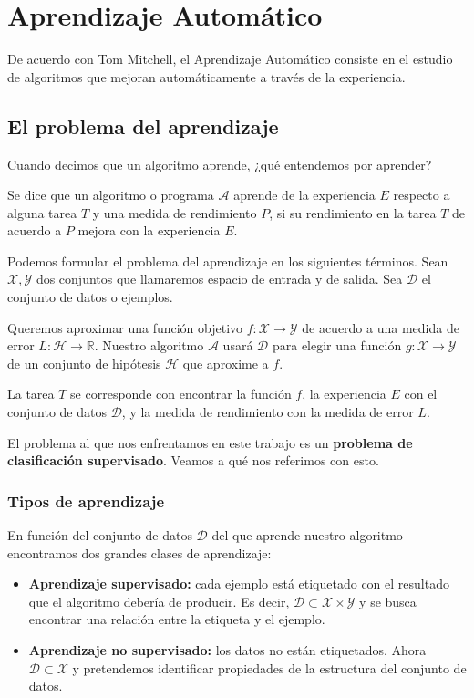 \chapter{\label{ch3}Aprendizaje Automático}

De acuerdo con Tom Mitchell, el Aprendizaje Automático consiste en el estudio de algoritmos que mejoran automáticamente a través de la experiencia. 

\section{El problema del aprendizaje}

Cuando decimos que un algoritmo aprende, ¿qué entendemos por aprender? 

\begin{definition*}
	Se dice que un algoritmo o programa $\mathcal{A}$ aprende de la experiencia $E$ respecto a alguna tarea $T$ y una medida de rendimiento $P$, si su rendimiento en la tarea $T$ de acuerdo a $P$ mejora con la experiencia $E$.
\end{definition*}

Podemos formular el problema del aprendizaje en los siguientes términos. Sean $\mathcal{X, Y}$ dos conjuntos que llamaremos espacio de entrada y de salida. Sea $\mathcal{D}$ el conjunto de datos o ejemplos.

Queremos aproximar una función objetivo $f: \mathcal{X} \to \mathcal{Y}$ de acuerdo a una medida de error $L: \mathcal{H} \to \mathbb{R}$. Nuestro algoritmo $\mathcal{A}$ usará $\mathcal{D}$ para elegir una función $g: \mathcal{X} \to \mathcal{Y}$ de un conjunto de hipótesis $\mathcal{H}$ que aproxime a $f$.

La tarea $T$ se corresponde con encontrar la función $f$, la experiencia $E$ con el conjunto de datos $\mathcal{D}$, y la medida de rendimiento con la medida de error $L$.

El problema al que nos enfrentamos en este trabajo es un \textbf{problema de clasificación supervisado}. Veamos a qué nos referimos con esto. 

\subsection{Tipos de aprendizaje}
En función del conjunto de datos $\mathcal{D}$ del que aprende nuestro algoritmo encontramos dos grandes clases de aprendizaje:
\begin{itemize}
	\item \textbf{Aprendizaje supervisado:} cada ejemplo está etiquetado con el resultado que el algoritmo debería de producir. Es decir, $\mathcal{D}\subset\mathcal{X}\times\mathcal{Y}$ y se busca encontrar una relación entre la etiqueta y el ejemplo.
	\item \textbf{Aprendizaje no supervisado:} los datos no están etiquetados. Ahora $\mathcal{D}\subset\mathcal{X}$ y pretendemos identificar propiedades de la estructura del conjunto de datos. 
\end{itemize}

